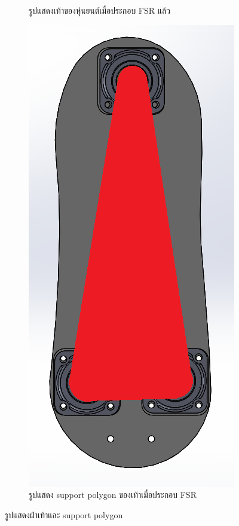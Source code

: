 \begin{figure}[!ht]
\begin{subfigure}[b]{0.3\linewidth}
    \caption{รูปแสดงเท้าของหุ่นยนต์เมื่อประกอบ FSR แล้ว}
  \end{subfigure}
  \begin{subfigure}[b]{0.3\linewidth}
    \includegraphics[width=\linewidth]{chapter4/images/foot+FSR_sp.PNG}
    \caption{รูปแสดง support polygon ของเท้าเมื่อประกอบ FSR}
  \end{subfigure}
  \caption{รูปแสดงฝ่าเท้าและ support polygon}
  \label{fig:foot_FSR}
\end{figure}

